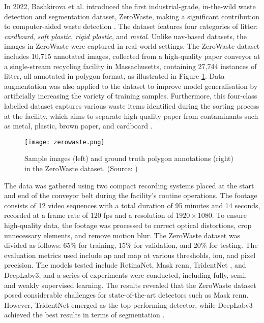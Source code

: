 In 2022, Bashkirova et al. introduced the first industrial-grade, in-the-wild waste detection and segmentation dataset, ZeroWaste, making a significant contribution to computer-aided waste detection \cite{zerowaste}. The dataset features four categories of litter: \textit{cardboard}, \textit{soft plastic}, \textit{rigid plastic}, and \textit{metal}. Unlike \gls{uav}-based datasets, the images in ZeroWaste were captured in real-world settings.
The ZeroWaste dataset includes 10,715 annotated images, collected from a high-quality paper conveyor at a single-stream recycling facility in Massachusetts, containing 27,744 instances of litter, all annotated in polygon format, as illustrated in Figure \ref{fig:zerowaste}. Data augmentation was also applied to the dataset to improve model generalisation by artificially increasing the variety of training samples. Furthermore, this four-class labelled dataset captures various waste items identified during the sorting process at the facility, which aims to separate high-quality paper from contaminants such as metal, plastic, brown paper, and cardboard \cite{zerowaste}.

\begin{figure}[!htbp]
    \centering
    \texttt{[image: zerowaste.png]}
    \caption{Sample images (left) and ground truth polygon annotations (right) in the ZeroWaste dataset. (Source: \cite{zerowaste})}
    \label{fig:zerowaste}
\end{figure}

The data was gathered using two compact recording systems placed at the start and end of the conveyor belt during the facility's routine operations. The footage consists of 12 video sequences with a total duration of 95 minutes and 14 seconds, recorded at a frame rate of 120 \gls{fps} and a resolution of $1920 \times 1080$. To ensure high-quality data, the footage was processed to correct optical distortions, crop unnecessary elements, and remove motion blur.
The ZeroWaste dataset was divided as follows: 65\% for training, 15\% for validation, and 20\% for testing. The evaluation metrics used include \gls{ap} and \gls{map} at various thresholds, \gls{iou}, and pixel precision. The models tested include RetinaNet, Mask \gls{rcnn}, TridentNet \cite{tridentnet}, and DeepLabv3, and a series of experiments were conducted, including fully, semi, and weakly supervised learning.
The results revealed that the ZeroWaste dataset posed considerable challenges for state-of-the-art detectors such as Mask \gls{rcnn}. However, TridentNet emerged as the top-performing detector, while DeepLabv3 achieved the best results in terms of segmentation \cite{zerowaste}.

